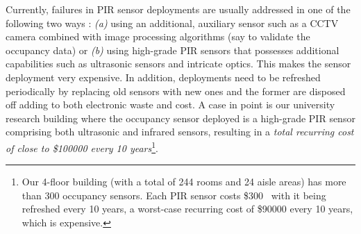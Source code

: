\documentclass[manuscript,screen,review]{acmart} %
\newcommand{\viz}{{\it viz.,}\xspace}
\newcommand{\ca}{{\it (a) }}
\newcommand{\cb}{{\it (b) }}
\begin{document}
Currently, failures in PIR sensor deployments are usually addressed in one of the following two ways : \ca using an additional, auxiliary sensor such as a CCTV camera combined with image processing algorithms (say to validate the occupancy data) or \cb using high-grade PIR sensors that possesses additional capabilities such as ultrasonic sensors and intricate optics. This makes the sensor deployment very expensive. In addition, deployments need to be refreshed periodically by replacing old sensors with new ones and the former are disposed off adding to both electronic waste and cost. A case in point is our university research building where the occupancy sensor deployed is a high-grade PIR sensor comprising both ultrasonic and infrared sensors, resulting in a \emph{total recurring cost of close to \$100000 every 10 years}\footnote{Our 4-floor building (with a total of 244 rooms and 24 aisle areas) has more than 300 occupancy sensors. Each PIR sensor costs \$300~\cite{hubbell_ADT1600WRP, hubbell_ATD2000CRP} with it being refreshed every 10 years, a worst-case recurring cost of \$90000 every 10 years, which is expensive.}.

\end{document}
